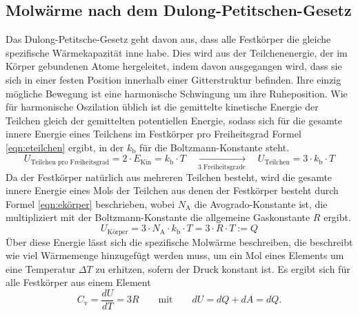 \documentclass[titlepage = firstcover]{scrartcl}
\begin{document}
        \subsection{Molwärme nach dem Dulong-Petitschen-Gesetz}
            Das Dulong-Petitsche-Gesetz geht davon aus, dass alle Festkörper die gleiche spezifische Wärmekapazität inne habe. Dies wird aus der
            Teilchenenergie, der im Körper gebundenen Atome hergeleitet, indem davon ausgegangen wird, dass sie sich in einer festen Position
            innerhalb einer Gitterstruktur befinden. Ihre einzig mögliche Bewegung ist eine harmonische Schwingung um ihre Ruheposition. Wie für
            harmonische Oszilation üblich ist die gemittelte kinetische Energie der Teilchen gleich der gemittelten potentiellen Energie, sodass sich für die gesamte innere Energie eines 
            Teilchens im Festkörper pro Freiheitsgrad Formel \eqref{eqn:eteilchen} ergibt, in der $k_{\text{b}}$ für die Boltzmann-Konstante steht.
            \begin{equation}
                U_{\text{Teilchen pro Freiheitsgrad}} = 2 \cdot E_{\text{Kin}} = k_{\text{b}} \cdot T \quad \xrightarrow[\text{3 Freiheitsgrade}]{} \quad U_{\text{Teilchen}} = 3 \cdot k_{\text{b}} \cdot T
                \label{eqn:eteilchen}
            \end{equation} 
            Da der Festkörper natürlich aus mehreren Teilchen besteht, wird die gesamte innere Energie eines Mols der Teilchen aus denen der Festkörper besteht durch Formel \eqref{eqn:ekörper} beschrieben, 
            wobei $N_{\text{A}}$ die Avogrado-Konstante ist, die multipliziert mit der Boltzmann-Konstante die allgemeine Gaskonstante $R$ ergibt. 
            \begin{equation}
                U_{\text{Körper}} = 3 \cdot N_{\text{A}} \cdot k_{\text{b}} \cdot T = 3 \cdot R \cdot T := Q
                \label{eqn:ekörper}
            \end{equation}
            Über diese Energie lässt sich die spezifische Molwärme beschreiben, die beschreibt wie viel Wärmemenge hinzugefügt werden muss, um ein Mol eines
            Elements um eine Temperatur $\Delta T$ zu erhitzen, sofern der Druck konstant ist. Es ergibt sich für alle Festkörper aus einem Element
            \begin{equation}
                C_{\text{v}} = \frac{dU}{dT} = 3R \qquad \text{mit} \qquad dU = dQ + dA = dQ .
            \end{equation}
            
\end{document}
